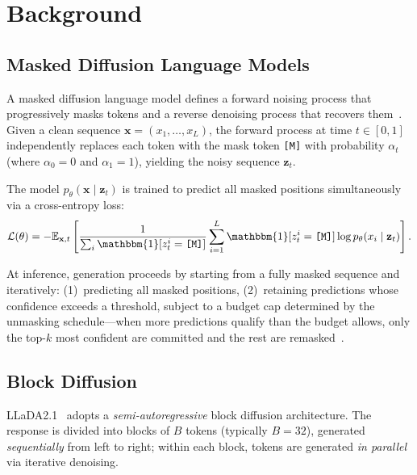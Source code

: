 \documentclass{article}
\newcommand{\mask}{\texttt{[M]}}
\begin{document}
\section{Background}
\label{sec:background}

\subsection{Masked Diffusion Language Models}

A masked diffusion language model defines a forward noising process that progressively masks tokens and a reverse denoising process that recovers them~\citep{austin2021d3pm,ou2025absorbingdiscrete,sahoo2024mdlm}. Given a clean sequence $\mathbf{x} = (x_1, \ldots, x_L)$, the forward process at time $t \in [0,1]$ independently replaces each token with the mask token \mask{} with probability $\alpha_t$ (where $\alpha_0 = 0$ and $\alpha_1 = 1$), yielding the noisy sequence $\mathbf{z}_t$.

The model $p_\theta(\mathbf{x} \mid \mathbf{z}_t)$ is trained to predict all masked positions simultaneously via a cross-entropy loss:
\begin{equation}
    \mathcal{L}(\theta) = -\mathbb{E}_{\mathbf{x}, t}\left[\frac{1}{\sum_i \mathbbm{1}[z_t^i = \mask{}]} \sum_{i=1}^{L} \mathbbm{1}[z_t^i = \mask{}] \log p_\theta(x_i \mid \mathbf{z}_t)\right].
    \label{eq:mdlm_loss}
\end{equation}

At inference, generation proceeds by starting from a fully masked sequence and iteratively: (1)~predicting all masked positions, (2)~retaining predictions whose confidence exceeds a threshold, subject to a budget cap determined by the unmasking schedule---when more predictions qualify than the budget allows, only the top-$k$ most confident are committed and the rest are remasked~\citep{sahoo2024mdlm}.

\subsection{Block Diffusion}
\label{sec:block_diffusion}

LLaDA2.1~\citep{nie2026llada21} adopts a \emph{semi-autoregressive} block diffusion architecture. The response is divided into blocks of $B$ tokens (typically $B=32$), generated \emph{sequentially} from left to right; within each block, tokens are generated \emph{in parallel} via iterative denoising.
\end{document}
